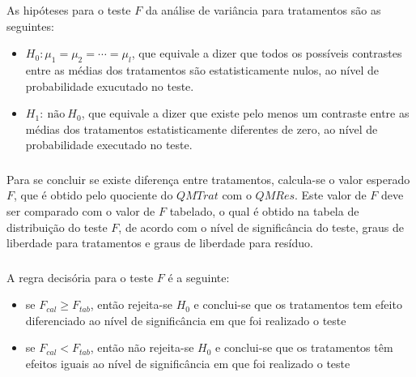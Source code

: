 \documentclass[14pt,aspectratio=1610]{beamer}
\begin{document}
\begin{frame}{}
\frametitle{}
\begin{block}{}
\justifying
As hipóteses para o teste $F$ da análise de variância para tratamentos são as seguintes:
\begin{itemize}
\item $H_0: \mu_1 = \mu_2 = \cdots = \mu_l$, que equivale a dizer que todos os possíveis contrastes entre as médias dos tratamentos são estatisticamente nulos, ao nível de probabilidade exucutado no teste.
\item $H_1:\ \textrm{não}\ H_0$, que equivale a dizer que existe pelo menos um contraste entre as médias dos tratamentos estatisticamente diferentes de zero, ao nível de probabilidade executado no teste.
\end{itemize}
\end{block}
\end{frame}

\begin{frame}{}
\frametitle{}
\begin{block}{}
\justifying
Para se concluir se existe diferença entre tratamentos, calcula-se o valor esperado $F$, que é obtido pelo quociente do $QMTrat$ com o $QMRes$. Este valor de 
$F$ deve ser comparado com o valor de $F$ tabelado, o qual é obtido na tabela de distribuição do teste $F$, de acordo com o nível de significância do teste, graus 
de liberdade para tratamentos e graus de liberdade para resíduo.
\end{block}
\end{frame}

\begin{frame}{}
\frametitle{}
\begin{block}{}
\justifying
A regra decisória para o teste $F$ é a seguinte:
\begin{itemize}
\item se $F_{cal} \geq F_{tab}$, então rejeita-se $H_0$ e conclui-se que os tratamentos tem efeito diferenciado ao nível de significância em que foi realizado o teste
\item se $F_{cal} < F_{tab}$, então não rejeita-se $H_0$ e conclui-se que os tratamentos têm efeitos iguais ao nível de significância em que foi realizado o teste
\end{itemize}
\end{block}
\end{frame}
\end{document}
